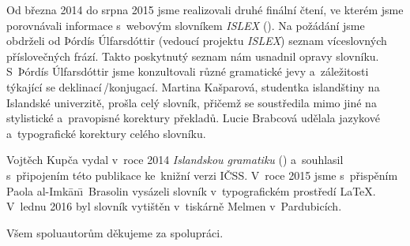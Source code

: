 Od března 2014 do srpna 2015 jsme realizovali druhé finální čtení, ve kterém jsme porovnávali informace s~webovým slovníkem \textit{ISLEX} (\cite {int1}). 
Na požádání jsme obdrželi od Þórdís Úlfarsdóttir (vedoucí projektu \textit{ISLEX}) seznam víceslovných příslovečných frází. Takto poskytnutý seznam nám usnadnil opravy slovníku. 
S~Þórdís Úlfarsdóttir jsme konzultovali různé gramatické jevy a~záležitosti týkající se deklinací\,/\addthin konjugací.
Martina Kašparová, studentka islandštiny na Islandské univerzitě, prošla celý slovník, přičemž se soustředila mimo jiné na stylistické a~pravopisné korektury překladů. 
Lucie Brabcová udělala jazykové a~typografické korektury celého slovníku.

Vojtěch Kupča vydal v~roce 2014 \textit{Islandskou gramatiku} (\cite {is77}) a~souhlasil s~připojením této publikace ke~knižní verzi IČSS.
V~roce 2015 jsme s~přispěním Paola al-Imk\=an\=\i\ Brasolin vysázeli slovník v~typografickém prostředí {\LaTeX}. V~lednu 2016 byl slovník vytištěn v~tiskárně Melmen v~Pardubicích.

\blspace[5]

{\centering Všem spoluautorům děkujeme za spolupráci.\par}
